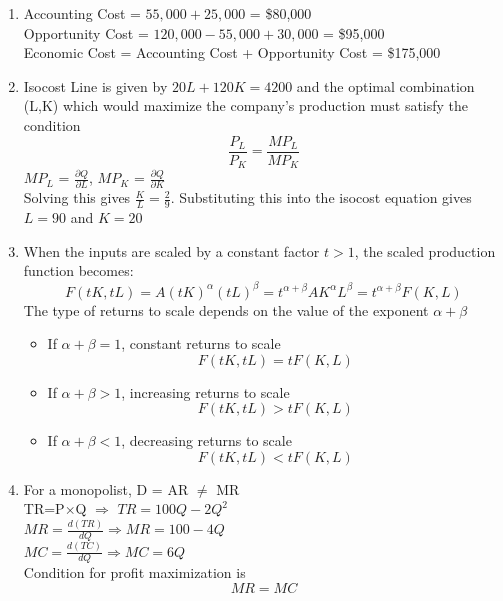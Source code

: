 \documentclass{article}
\begin{document}
\begin{enumerate}
        Solving this gives $y=2x$. Substituting this into the budget constraint gives x=5 $\Rightarrow$ y=10 \\
        $\therefore$ (5,10) is the optimum consumption bundle.
    \item 
        Accounting Cost = $55,000 + 25,000$ = \$80,000 \\
        Opportunity Cost = $120,000-55,000+30,000$ = \$95,000 \\
        Economic Cost = Accounting Cost + Opportunity Cost = \$175,000
    \item 
        Isocost Line is given by $20L+120K=4200$ and the optimal combination (L,K) which would maximize the company's production must satisfy the condition
        \[
        \frac{P_L}{P_K} = \frac{MP_L}{MP_K}
        \]
        $MP_L$ = \(\frac{\partial Q}{\partial L}\), $MP_K$ = \(\frac{\partial Q}{\partial K}\)\\
        Solving this gives \(\frac{K}{L}=\frac{2}{9}\). Substituting this into the isocost equation gives $L=90$ and $K=20$
    \item 
        When the inputs are scaled by a constant factor \( t > 1 \), the scaled production function becomes:
        \[
        F(tK, tL) = A (tK)^\alpha (tL)^\beta = t^{\alpha + \beta} A K^\alpha L^\beta = t^{\alpha + \beta} F(K,L)
        \]
        The type of returns to scale depends on the value of the exponent \( \alpha + \beta \)
        \begin{itemize}
            \item If \( \alpha + \beta = 1 \), constant returns to scale
            \[
            F(tK, tL) = tF(K, L)
            \]
            \item If \( \alpha + \beta > 1 \), increasing returns to scale
            \[
            F(tK, tL) > tF(K, L)
            \]
            \item  If \( \alpha + \beta < 1 \), decreasing returns to scale
            \[
            F(tK, tL) < tF(K, L)
            \]
        \end{itemize}
    \item 
        For a monopolist, D = AR $\neq$ MR \\
        TR=P$\times$Q $\Rightarrow$ $TR = 100Q-2Q^2$ \\
        $MR=\frac{d(TR)}{dQ} \Rightarrow MR=100-4Q$ \\
        $MC=\frac{d(TC)}{dQ} \Rightarrow MC=6Q$ \\
        Condition for profit maximization is 
        \[
        MR = MC
\]
\end{enumerate}
\end{document}
